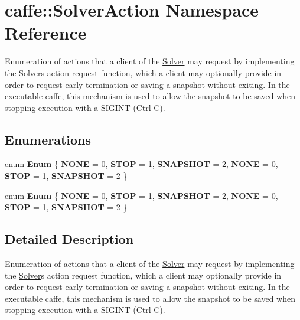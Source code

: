 \hypertarget{namespacecaffe_1_1_solver_action}{}\section{caffe\+:\+:Solver\+Action Namespace Reference}
\label{namespacecaffe_1_1_solver_action}


Enumeration of actions that a client of the \mbox{\hyperlink{classcaffe_1_1_solver}{Solver}} may request by implementing the \mbox{\hyperlink{classcaffe_1_1_solver}{Solver}}\textquotesingle{}s action request function, which a client may optionally provide in order to request early termination or saving a snapshot without exiting. In the executable caffe, this mechanism is used to allow the snapshot to be saved when stopping execution with a S\+I\+G\+I\+NT (Ctrl-\/C).  


\subsection*{Enumerations}
\begin{DoxyCompactItemize}
\item 
\mbox{\label{namespacecaffe_1_1_solver_action_a9d457807cfac957a8277439ed1724be9}} 
enum {\bfseries Enum} \{ \newline
{\bfseries N\+O\+NE} = 0, 
{\bfseries S\+T\+OP} = 1, 
{\bfseries S\+N\+A\+P\+S\+H\+OT} = 2, 
{\bfseries N\+O\+NE} = 0, 
\newline
{\bfseries S\+T\+OP} = 1, 
{\bfseries S\+N\+A\+P\+S\+H\+OT} = 2
 \}
\item 
\mbox{\label{namespacecaffe_1_1_solver_action_a9d457807cfac957a8277439ed1724be9}} 
enum {\bfseries Enum} \{ \newline
{\bfseries N\+O\+NE} = 0, 
{\bfseries S\+T\+OP} = 1, 
{\bfseries S\+N\+A\+P\+S\+H\+OT} = 2, 
{\bfseries N\+O\+NE} = 0, 
\newline
{\bfseries S\+T\+OP} = 1, 
{\bfseries S\+N\+A\+P\+S\+H\+OT} = 2
 \}
\end{DoxyCompactItemize}


\subsection{Detailed Description}
Enumeration of actions that a client of the \mbox{\hyperlink{classcaffe_1_1_solver}{Solver}} may request by implementing the \mbox{\hyperlink{classcaffe_1_1_solver}{Solver}}\textquotesingle{}s action request function, which a client may optionally provide in order to request early termination or saving a snapshot without exiting. In the executable caffe, this mechanism is used to allow the snapshot to be saved when stopping execution with a S\+I\+G\+I\+NT (Ctrl-\/C). 
